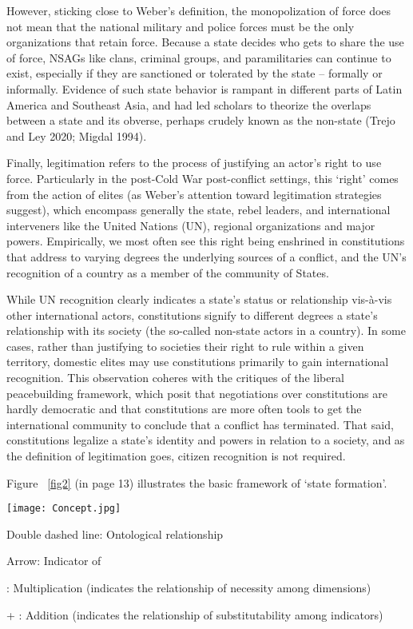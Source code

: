 \documentclass [11pt]{article}
\begin{document}
However, sticking close to Weber's definition, the monopolization of force does not mean that the national military and police forces must be the only organizations that retain force. Because a state decides who gets to share the use of force, NSAGs like clans, criminal groups, and paramilitaries can continue to exist, especially if they are sanctioned or tolerated by the state -- formally or informally. Evidence of such state behavior is rampant in different parts of Latin America and Southeast Asia, and had led scholars to theorize the overlaps between a state and its obverse, perhaps crudely known as the non-state (Trejo and Ley 2020; Migdal 1994).

Finally, legitimation refers to the process of justifying an actor's right to use force. Particularly in the post-Cold War post-conflict settings, this `right' comes from the action of elites (as Weber's attention toward legitimation strategies suggest), which encompass generally the state, rebel leaders, and international interveners like the United Nations (UN), regional organizations and major powers. Empirically, we most often see this right being enshrined in constitutions that address to varying degrees the underlying sources of a conflict, and the UN's recognition of a country as a member of the community of States.

While UN recognition clearly indicates a state's status or relationship vis-à-vis other international actors, constitutions signify to different degrees a state's relationship with its society (the so-called non-state actors in a country). In some cases, rather than justifying to societies their right to rule within a given territory, domestic elites may use constitutions primarily to gain international recognition. This observation coheres with the critiques of the liberal peacebuilding framework, which posit that negotiations over constitutions are hardly democratic and that constitutions are more often tools to get the international community to conclude that a conflict has terminated. That said, constitutions legalize a state's identity and powers in relation to a society, and as the definition of legitimation goes, citizen recognition is not required.

Figure ~\ref{fig2} (in page 13) illustrates the basic framework of `state formation'.

\begin{sidewaysfigure}[ht]
\caption{Basic Framework of State Formation}
\label{fig2}
\begin{center} 
\texttt{[image: Concept.jpg]}

{\footnotesize Double dashed line: Ontological relationship}

{\footnotesize Arrow: Indicator of}

{\footnotesize * : Multiplication (indicates the relationship of necessity among dimensions)}

{\footnotesize + : Addition (indicates the relationship of substitutability among indicators)}
  
\end{center}
\end{sidewaysfigure}
\end{document}
